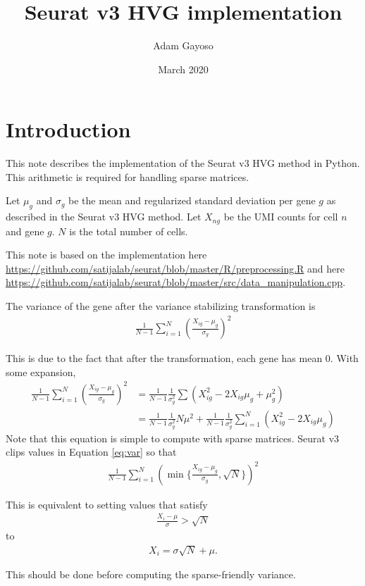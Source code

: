 \documentclass{article}
\title{Seurat v3 HVG implementation}
\author{Adam Gayoso}
\date{March 2020}
\begin{document}
\maketitle

\section{Introduction}

This note describes the implementation of the Seurat v3 HVG method in Python.
This arithmetic is required for handling sparse matrices.

Let $\mu_g$ and $\sigma_g$ be the mean and regularized standard deviation per
gene $g$ as described in the Seurat v3 HVG method. Let $X_{ng}$ be the UMI
counts for cell $n$ and gene $g$. $N$ is the total number of cells.

This note is based on the implementation here
\url{https://github.com/satijalab/seurat/blob/master/R/preprocessing.R} and here
\url{https://github.com/satijalab/seurat/blob/master/src/data_manipulation.cpp}.

The variance of the gene after the variance stabilizing transformation is
\begin{align}
	\frac{1}{N -1}\sum_{i=1}^N(\frac{X_{ig}-\mu_g}{\sigma_g})^2
\label{eq:var}
\end{align}

This is due to the fact that after the transformation, each gene has mean 0.
With some expansion,
\begin{align}
	\frac{1}{N -1}\sum_{i=1}^N(\frac{X_{ig}-\mu_g}{\sigma_g})^2 & = \frac{1}{N-1}\frac{1}{\sigma_g^2}\sum(X_{ig}^2-2X_{ig}\mu_g + \mu_g^2)                                        \\
	                                                            & =\frac{1}{N-1}\frac{1}{\sigma_g^2}N\mu^2 + \frac{1}{N-1}\frac{1}{\sigma_g^2}\sum_{i=1}^N(X_{ig}^2-2X_{ig}\mu_g)
\end{align}
Note that this equation is simple to compute with sparse matrices.
Seurat v3 clips values in Equation \ref{eq:var} so that
\begin{align}
	\frac{1}{N -1}\sum_{i=1}^N(\min\{\frac{X_{ig}-\mu_g}{\sigma_g}, \sqrt{N}\})^2
\label{eq:var_adj}
\end{align}

This is equivalent to setting values that satisfy
\begin{align}
	\frac{X_i-\mu}{\sigma} > \sqrt{N}
\end{align}
to
\begin{align}
	X_i = \sigma\sqrt{N} + \mu.
\end{align}

This should be done before computing the sparse-friendly variance.
\end{document}

